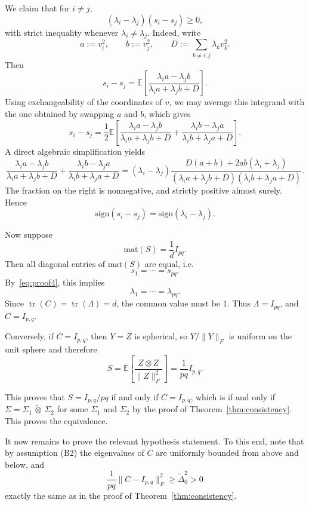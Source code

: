 \documentclass[12pt]{article}
\newcommand{\E}{\mathbb{E}}
\newcommand{\mat}{\mathrm{mat}}
\newcommand{\tr}{\operatorname{tr}}
\newcommand{\ot}{\,\tilde\otimes\,}
\begin{document}
We claim that for \(i\neq j\),
	\[
	(\lambda_i-\lambda_j)(s_i-s_j)\ge 0,
	\]
	with strict inequality whenever \(\lambda_i\neq \lambda_j\).
Indeed, write
	\[
	a:=v_i^2,\qquad b:=v_j^2,\qquad D:=\sum_{k\neq i,j}\lambda_k v_k^2.
	\]
	Then
	\[
	s_i-s_j
	=
	\E\!\left[
	\frac{\lambda_i a-\lambda_j b}{\lambda_i a+\lambda_j b+D}
	\right].
	\]
	Using exchangeability of the coordinates of \(v\), we may average this integrand
	with the one obtained by swapping \(a\) and \(b\), which gives
	\begin{equation}\label{eq:eigdiff}
	s_i-s_j
	=
	\frac12\E\!\left[
	\frac{\lambda_i a-\lambda_j b}{\lambda_i a+\lambda_j b+D}
	+
	\frac{\lambda_i b-\lambda_j a}{\lambda_i b+\lambda_j a+D}
	\right].
	\end{equation}
	A direct algebraic simplification yields
	\[
	\frac{\lambda_i a-\lambda_j b}{\lambda_i a+\lambda_j b+D}
	+
	\frac{\lambda_i b-\lambda_j a}{\lambda_i b+\lambda_j a+D}
	=
	(\lambda_i-\lambda_j)
	\frac{D(a+b)+2ab(\lambda_i+\lambda_j)}
	{(\lambda_i a+\lambda_j b+D)(\lambda_i b+\lambda_j a+D)}.
	\]
	The fraction on the right is nonnegative, and strictly positive almost surely.
	Hence
	\begin{equation}\label{eq:proof4}
	\mathrm{sign}(s_i-s_j)=\mathrm{sign}(\lambda_i-\lambda_j).
	\end{equation}
	
	Now suppose
	\[
	\mat(S)=\frac1d I_{pq}.
	\]
	Then all diagonal entries of $\mat(S)$ are equal, i.e.
	\[
	s_1=\cdots=s_{pq}.
	\]
	By~\eqref{eq:proof4}, this implies
	\[
	\lambda_1=\cdots=\lambda_{pq}.
	\]
	Since \(\tr(C)=\tr(\Lambda)=d\), the common value must be \(1\). Thus $
	\Lambda=I_{pq}$, and $C=I_{p,q}$.
	
	Conversely, if $C=I_{p,q}$, then $Y=Z$ is spherical, so $Y/\|Y\|_F$ is uniform on
	the unit sphere and therefore
	\[
	S=\E\left[\frac{Z \otimes Z}{\|Z\|_F^2}\right]=\frac1{pq} I_{p,q}.
	\]
	
	This proves that $S=I_{p,q}/pq$ if and only if $C=I_{p,q}$, which is if and only if $\Sigma=\Sigma_1 \ot \Sigma_2$ for some $\Sigma_1$ and $\Sigma_2$ by the proof of Theorem~\ref{thm:consistency}. This proves the equivalence.

    It now remains to prove the relevant hypothesis statement. To this end, note that by assumption (B2) the eigenvalues of $C$ are uniformly bounded from above and below, and
    \[
    \frac{1}{pq}\|C-I_{p,q}\|^2_F \geq \widetilde{\Delta}^2_0 > 0
    \]
    exactly the same as in the proof of Theorem~\ref{thm:consistency}.
\end{document}
